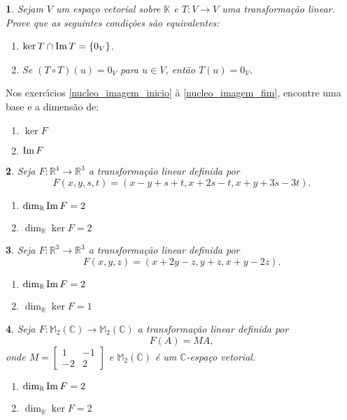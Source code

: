 \documentclass[12pt]{exam}
\newtheorem{exercicio}{}
\newcommand{\im}{{\rm Im\,}}
\newcommand{\real}{\mathbb{R}}
\newcommand{\complex}{\mathbb{C}}
\newcommand{\cp}[1]{\mathbb{#1}}
\begin{document}
\begin{exercicio}
  Sejam $V$ um espa\c{c}o vetorial sobre $\cp{K}$ e $T : V \to V$ uma transforma\c{c}\~ao linear. Prove que as seguintes condi\c{c}\~oes s\~ao equivalentes:
  \begin{enumerate}
    \item $\ker T \cap \im T = \{0_V\}$.
    \item Se $(T\circ T)(u) = 0_V$ para $u \in V$, ent\~ao $T(u) = 0_V$.
  \end{enumerate}
\end{exercicio}

Nos exerc{\'\i}cios \eqref{nucleo_imagem_inicio} \`a \eqref{nucleo_imagem_fim}, encontre uma base e a dimens\~ao de:
\begin{enumerate}[label=({\alph*})]
    \item $\ker F$
    \item $\im F$
  \end{enumerate}

\begin{exercicio}\label{nucleo_imagem_inicio}
  Seja $F : \real^4 \to \real^3$ a transforma\c{c}\~ao linear definida por
  \[
    F(x,y,s,t) = (x - y + s + t, x + 2s - t, x + y + 3s - 3t).
  \]
  \begin{solucao}
    \begin{enumerate}[label=({\alph*})]
      \item $\dim_\real\im F = 2$
      \item $\dim_\real\ker F = 2$
    \end{enumerate}
  \end{solucao}
\end{exercicio}

\begin{exercicio}
  Seja $F : \real^3 \to \real^3$ a transforma\c{c}\~ao linear definida por
  \[
    F(x,y,z) = (x + 2y - z, y + z, x + y - 2z).
  \]
  \begin{solucao}
    \begin{enumerate}[label=({\alph*})]
      \item $\dim_\real\im F = 2$
      \item $\dim_\real\ker F = 1$
    \end{enumerate}
  \end{solucao}
\end{exercicio}

\begin{exercicio}
  Seja $F : \cp{M}_2(\complex) \to \cp{M}_2(\complex)$ a transforma\c{c}\~ao linear definida por
  \[
    F(A) = MA,
  \]
  onde $M = \begin{bmatrix}
    1 & -1\\-2 & 2
  \end{bmatrix}$ e $\cp{M}_2(\complex)$ \'e um $\complex$-espa\c{c}o vetorial.
  \begin{solucao}
    \begin{enumerate}[label=({\alph*})]
      \item $\dim_\real\im F = 2$
      \item $\dim_\real\ker F = 2$
    \end{enumerate}
  \end{solucao}
\end{exercicio}
\end{document}
